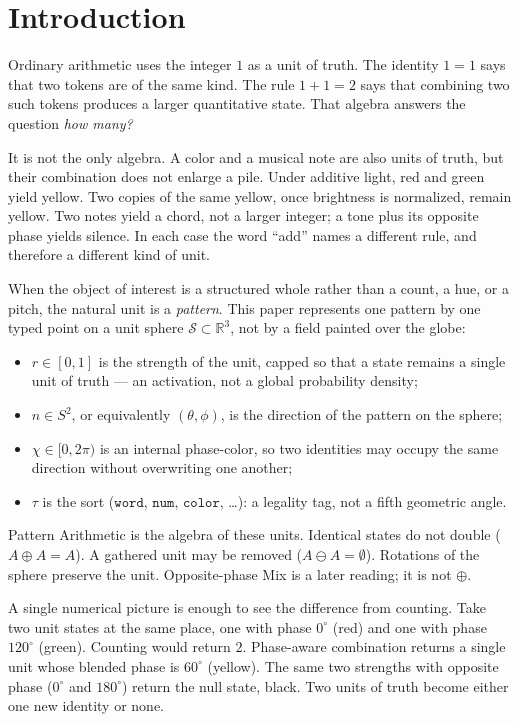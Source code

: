 \documentclass[12pt, a4paper]{article}
\begin{document}
\section{Introduction}

Ordinary arithmetic uses the integer $1$ as a unit of truth.
The identity $1=1$ says that two tokens are of the same kind.
The rule $1+1=2$ says that combining two such tokens produces a
larger quantitative state. That algebra answers the question
\emph{how many?}

It is not the only algebra. A color and a musical note are also
units of truth, but their combination does not enlarge a pile.
Under additive light, red and green yield yellow. Two copies of
the same yellow, once brightness is normalized, remain yellow.
Two notes yield a chord, not a larger integer; a tone plus its
opposite phase yields silence. In each case the word ``add''
names a different rule, and therefore a different kind of unit.

When the object of interest is a structured whole rather than a
count, a hue, or a pitch, the natural unit is a \emph{pattern}.
This paper represents one pattern by one typed point on a unit
sphere $\mathcal{S} \subset \mathbb{R}^3$, not by a field painted over the globe:
\begin{itemize}
    \item $r \in [0, 1]$ is the strength of the unit, capped so that a state remains a single unit of truth --- an activation, not a global probability density;
    \item $\hat n \in S^2$, or equivalently $(\theta, \phi)$, is the direction of the pattern on the sphere;
    \item $\chi \in [0, 2\pi)$ is an internal phase-color, so two identities may occupy the same direction without overwriting one another;
    \item $\tau$ is the sort ($\mathtt{word}$, $\mathtt{num}$, $\mathtt{color}$, \ldots): a legality tag, not a fifth geometric angle.
\end{itemize}
Pattern Arithmetic is the algebra of these units. Identical states do not double ($A \oplus A = A$). A gathered unit may be removed ($A \ominus A = \emptyset$). Rotations of the sphere preserve the unit. Opposite-phase Mix is a later reading; it is not $\oplus$.

A single numerical picture is enough to see the difference from counting. Take two unit states at the same place, one with phase $0^\circ$ (red) and one with phase $120^\circ$ (green). Counting would return $2$. Phase-aware combination returns a single unit whose blended phase is $60^\circ$ (yellow). The same two strengths with opposite phase ($0^\circ$ and $180^\circ$) return the null state, black. Two units of truth become either one new identity or none.
\end{document}

